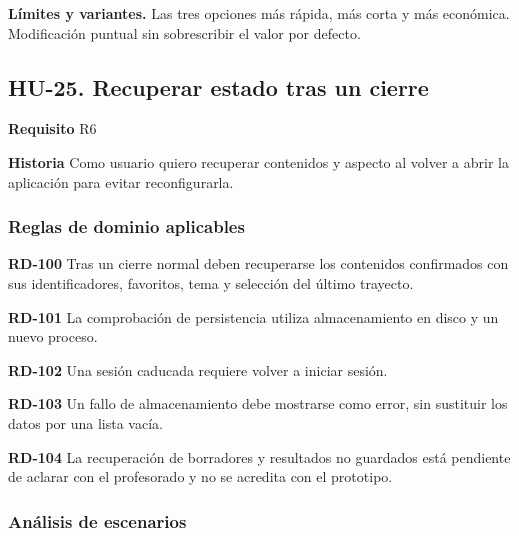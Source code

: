 {\fontsize{9}{11.8}\selectfont\textbf{Límites y variantes.} Las tres opciones más rápida, más corta y más económica. Modificación puntual sin sobrescribir el valor por defecto.\par}\vspace{4pt}
\clearpage\subsection*{HU-25. Recuperar estado tras un cierre}

\textbf{Requisito} R6\par

\textbf{Historia} Como usuario quiero recuperar contenidos y aspecto al volver a abrir la aplicación para evitar reconfigurarla.\par

\subsubsection*{Reglas de dominio aplicables}

\textbf{RD-100} Tras un cierre normal deben recuperarse los contenidos confirmados con sus identificadores, favoritos, tema y selección del último trayecto.\par

\textbf{RD-101} La comprobación de persistencia utiliza almacenamiento en disco y un nuevo proceso.\par

\textbf{RD-102} Una sesión caducada requiere volver a iniciar sesión.\par

\textbf{RD-103} Un fallo de almacenamiento debe mostrarse como error, sin sustituir los datos por una lista vacía.\par

\textbf{RD-104} La recuperación de borradores y resultados no guardados está pendiente de aclarar con el profesorado y no se acredita con el prototipo.\par

\subsubsection*{Análisis de escenarios}

